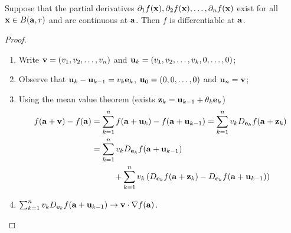 {}

\begin{theorem}
    Suppose that the partial derivatives \(\partial_1 f(\xx), \partial_2 f(\xx), \ldots, \partial_nf(\xx)\) exist for all \(\xx\in B(\aa,r)\) and are continuous at \(\aa\).
    Then \(f\) is differentiable at \(\aa\).
\end{theorem}
\begin{proof}

    \begin{enumerate}
        \item Write \(\vv = (v_1,v_2,\ldots,v_n)\)
              and
              \(\uu_k = (v_1,v_2,\ldots,v_k,0,\ldots,0)\);
        \item Observe that \(\uu_k - \uu_{k-1} = v_k \ee_k\), \(\uu_0 = (0,0,\ldots,0)\) and \(\uu_n = \vv\);
        \item Using the mean value theorem (exists \( \zz_k = \uu_{k-1}+ \theta_k \ee_k\)) \vspace{-0.9em}
              \[
                  \begin{aligned}
                      f(\aa+\vv) - f(\aa)
                       & = \sum_{k=1}^{n} f(\aa + \uu_k) - f(\aa + \uu_{k-1})
                      = \sum_{k=1}^{n} v_k  D_{\ee_k}f(\aa +  \zz_k)                                                                  \\
                       & = \sum_{k=1}^{n} v_k  D_{\ee_k}f(\aa + \uu_{k-1})                                                            \\
                       & \ \ \ \ \ \ \ \ + \sum_{k=1}^{n}  v_k \left(  D_{\ee_k}f(\aa +  \zz_k)-  D_{\ee_k}f(\aa + \uu_{k-1}) \right)
                  \end{aligned}
              \]
        \item \(\sum_{k=1}^{n} v_k  D_{\ee_k}f(\aa + \uu_{k-1}) \to \vv \cdot \nabla f(\aa)\). \qedhere
    \end{enumerate}
\end{proof}




% 





